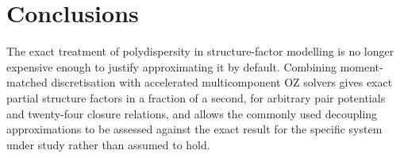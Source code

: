 \documentclass[11pt,a4paper]{article}
\begin{document}
\section{Conclusions}

The exact treatment of polydispersity in structure-factor modelling is no
longer expensive enough to justify approximating it by default. Combining
moment-matched discretisation with accelerated multicomponent OZ solvers gives
exact partial structure factors in a fraction of a second, for arbitrary pair
potentials and twenty-four closure relations, and allows the commonly used
decoupling approximations to be assessed against the exact result for the
specific system under study rather than assumed to hold.

\end{document}
